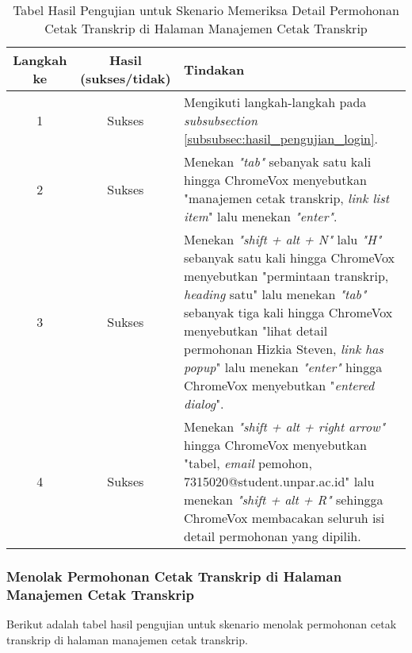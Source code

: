 \begin{table}[H]
    \centering 
    \caption{Tabel Hasil Pengujian untuk Skenario Memeriksa Detail Permohonan Cetak Transkrip di Halaman Manajemen Cetak Transkrip}
    \label{tab:hasil_pengujian_memeriksa_detail_permohonan_cetak_transkrip_di_halaman_manajemen_cetak_transkrip}
    \begin{tabular}{|c|c|p{10cm}|}
        \toprule
        Langkah ke & Hasil (sukses/tidak) & Tindakan \\

        \midrule
        1 & Sukses & Mengikuti langkah-langkah pada \textit{subsubsection} \ref{subsubsec:hasil_pengujian_login}. \\
        2 & Sukses & Menekan \textit{"tab"} sebanyak satu kali hingga ChromeVox menyebutkan "manajemen cetak transkrip, \textit{link list item}" lalu menekan \textit{"enter"}. \\
        3 & Sukses & Menekan \textit{"shift + alt + N"} lalu \textit{"H"} sebanyak satu kali hingga ChromeVox menyebutkan "permintaan transkrip, \textit{heading} satu" lalu menekan \textit{"tab"} sebanyak tiga kali hingga ChromeVox menyebutkan "lihat detail permohonan Hizkia Steven, \textit{link has popup}" lalu menekan \textit{"enter"} hingga ChromeVox menyebutkan "\textit{entered dialog}". \\
        4 & Sukses & Menekan \textit{"shift + alt + right arrow"} hingga ChromeVox menyebutkan "tabel, \textit{email} pemohon, 7315020@student.unpar.ac.id" lalu menekan \textit{"shift + alt + R"} sehingga ChromeVox membacakan seluruh isi detail permohonan yang dipilih. \\

        \bottomrule

    \end{tabular}
\end{table}

\subsubsection{Menolak Permohonan Cetak Transkrip di Halaman Manajemen Cetak Transkrip}
\label{subsubsec:hasil_pengujian_menolak_permohonan_cetak_transkrip_di_halaman_manajemen_cetak_transkrip}
Berikut adalah tabel hasil pengujian untuk skenario menolak permohonan cetak transkrip di halaman manajemen cetak transkrip.

